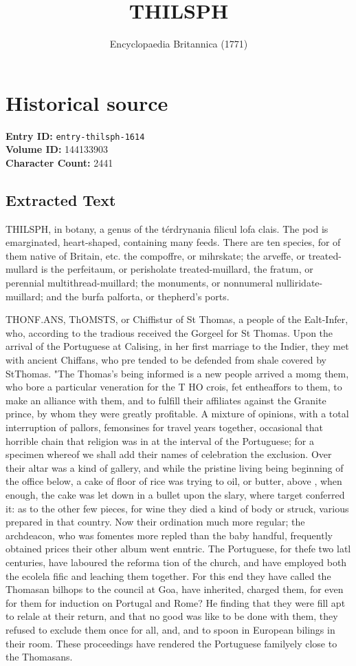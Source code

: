 \documentclass{article}
\title{THILSPH}
\date{Encyclopaedia Britannica (1771)}
\begin{document}
\maketitle

\section*{Historical source}
\textbf{Entry ID:} \texttt{entry-thilsph-1614} \\
\textbf{Volume ID:} 144133903 \\
\textbf{Character Count:} 2441

\subsection*{Extracted Text}
THILSPH, in botany, a genus of the térdrynania filicul lofa clais. The pod is emarginated, heart-shaped, containing many feeds. There are ten species, for of them native of Britain, etc. the compoffre, or mihrskate; the arveffe, or treated-mullard is the perfeitaum, or perisholate treated-muillard, the fratum, or perennial multithread-muillard; the monuments, or nonnumeral nulliridate-muillard; and the burfa palforta, or thepherd's ports.

THONF.ANS, ThOMSTS, or Chiffistur of St Thomas, a people of the Ealt-Infer, who, according to the tradious received the Gorgeel for St Thomas. Upon the arrival of the Portuguese at Calising, in her first marriage to the Indier, they met with ancient Chiffans, who pre tended to be defended from shale covered by StThomas. "The Thomas’s being informed is a new people arrived a momg them, who bore a particular veneration for the T HO crois, fet entheaffors to them, to make an alliance with them, and to fulfill their affiliates against the Granite prince, by whom they were greatly profitable. A mixture of opinions, with a total interruption of pallors, femonsines for travel years together, occasional that horrible chain that religion was in at the interval of the Portuguese; for a specimen whereof we shall add their names of celebration the exclusion. Over their altar was a kind of gallery, and while the pristine living being beginning of the office below, a cake of floor of rice was trying to oil, or butter, above , when enough, the cake was let down in a bullet upon the slary, where target conferred it: as to the other few pieces, for wine they died a kind of body or struck, various prepared in that country. Now their ordination much more regular; the archdeacon, who was fomentes more repled than the baby handful, frequently obtained prices their other album went enntric. The Portuguese, for thefe two latl centuries, have laboured the reforma tion of the church, and have employed both the ecolela fific and leaching them together. For this end they have called the Thomasan bilhops to the council at Goa, have inherited, charged them, for even for them for induction on Portugal and Rome? He finding that they were fill apt to relale at their return, and that no good was like to be done with them, they refused to exclude them once for all, and, and to spoon in European bilings in their room. These proceedings have rendered the Portuguese familyely close to the Thomasans.
\end{document}

